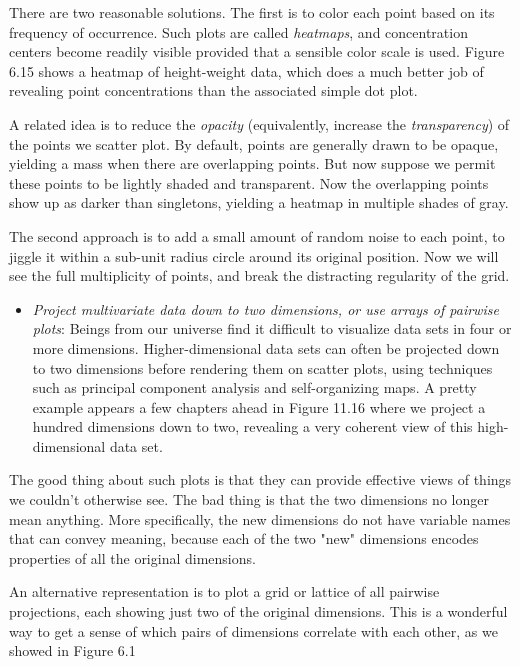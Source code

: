 \documentclass[10pt]{article}
\begin{document}
There are two reasonable solutions. The first is to color each point based on its frequency of occurrence. Such plots are called \textit{heatmaps}, and concentration centers become readily visible provided that a sensible color scale is used. Figure 6.15 shows a heatmap of height-weight data, which does a much better job of revealing point concentrations than the associated simple dot plot.

A related idea is to reduce the \textit{opacity} (equivalently, increase the \textit{transparency}) of the points we scatter plot. By default, points are generally drawn to be opaque, yielding a mass when there are overlapping points. But now suppose we permit these points to be lightly shaded and transparent. Now the overlapping points show up as darker than singletons, yielding a heatmap in multiple shades of gray.

The second approach is to add a small amount of random noise to each point, to jiggle it within a sub-unit radius circle around its original position. Now we will see the full multiplicity of points, and break the distracting regularity of the grid.

\begin{itemize}
  \item \textit{Project multivariate data down to two dimensions, or use arrays of pairwise plots}: Beings from our universe find it difficult to visualize data sets in four or more dimensions. Higher-dimensional data sets can often be projected down to two dimensions before rendering them on scatter plots, using techniques such as principal component analysis and self-organizing maps. A pretty example appears a few chapters ahead in Figure 11.16 where we project a hundred dimensions down to two, revealing a very coherent view of this high-dimensional data set.
\end{itemize}

The good thing about such plots is that they can provide effective views of things we couldn't otherwise see. The bad thing is that the two dimensions no longer mean anything. More specifically, the new dimensions do not have variable names that can convey meaning, because each of the two "new" dimensions encodes properties of all the original dimensions.

An alternative representation is to plot a grid or lattice of all pairwise projections, each showing just two of the original dimensions. This is a wonderful way to get a sense of which pairs of dimensions correlate with each other, as we showed in Figure 6.1
\end{document}

